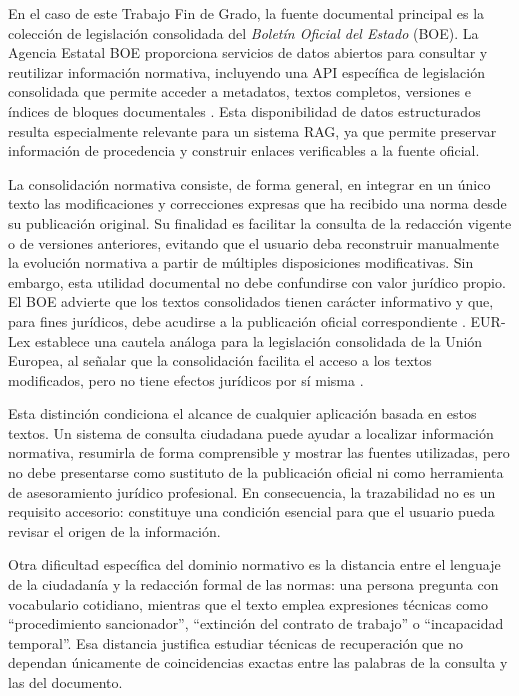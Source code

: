 En el caso de este Trabajo Fin de Grado, la fuente documental principal es la colección de legislación consolidada del \emph{Boletín Oficial del Estado} (BOE). La Agencia Estatal BOE proporciona servicios de datos abiertos para consultar y reutilizar información normativa, incluyendo una API específica de legislación consolidada que permite acceder a metadatos, textos completos, versiones e índices de bloques documentales \cite{boeApiConsolidada}. Esta disponibilidad de datos estructurados resulta especialmente relevante para un sistema RAG, ya que permite preservar información de procedencia y construir enlaces verificables a la fuente oficial.

La consolidación normativa consiste, de forma general, en integrar en un único texto las modificaciones y correcciones expresas que ha recibido una norma desde su publicación original. Su finalidad es facilitar la consulta de la redacción vigente o de versiones anteriores, evitando que el usuario deba reconstruir manualmente la evolución normativa a partir de múltiples disposiciones modificativas. Sin embargo, esta utilidad documental no debe confundirse con valor jurídico propio. El BOE advierte que los textos consolidados tienen carácter informativo y que, para fines jurídicos, debe acudirse a la publicación oficial correspondiente \cite{boeLegislacionActualizada}. EUR-Lex establece una cautela análoga para la legislación consolidada de la Unión Europea, al señalar que la consolidación facilita el acceso a los textos modificados, pero no tiene efectos jurídicos por sí misma \cite{eurlexConsolidation}.

Esta distinción condiciona el alcance de cualquier aplicación basada en estos textos. Un sistema de consulta ciudadana puede ayudar a localizar información normativa, resumirla de forma comprensible y mostrar las fuentes utilizadas, pero no debe presentarse como sustituto de la publicación oficial ni como herramienta de asesoramiento jurídico profesional. En consecuencia, la trazabilidad no es un requisito accesorio: constituye una condición esencial para que el usuario pueda revisar el origen de la información.

Otra dificultad específica del dominio normativo es la distancia entre el lenguaje de la ciudadanía y la redacción formal de las normas: una persona pregunta con vocabulario cotidiano, mientras que el texto emplea expresiones técnicas como ``procedimiento sancionador'', ``extinción del contrato de trabajo'' o ``incapacidad temporal''. Esa distancia justifica estudiar técnicas de recuperación que no dependan únicamente de coincidencias exactas entre las palabras de la consulta y las del documento.

